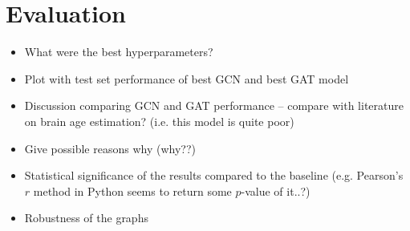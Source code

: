 \chapter{Evaluation}


\begin{itemize}
    \item What were the best hyperparameters?
    \item Plot with test set performance of best GCN and best GAT model
    \item Discussion comparing GCN and GAT performance – compare with literature on brain age estimation? (i.e. this model is quite poor)
    \item Give possible reasons why (why??)
    \item Statistical significance of the results compared to the baseline (e.g. Pearson's $r$ method in Python seems to return some $p$-value of it..?)
    \item Robustness of the graphs
\end{itemize}




